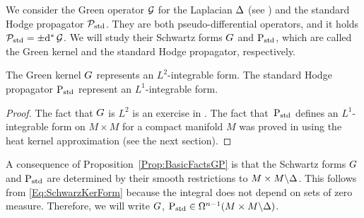 \documentclass[\MainFolder/Text.tex]{subfiles}
\begin{document}

We consider the Green operator $\operatorname{\mathcal{G}}$ for the Laplacian $\operatorname{\Delta}$ (see \cite{Warner1983}) and the standard Hodge propagator $\mathcal{P}_{\mathrm{std}}$. They are both pseudo-differential operators, and it holds $\mathcal{P}_{\mathrm{std}} = \pm \mathrm{d}^* \operatorname{\mathcal{G}}$. We will study their Schwartz forms $G$ and $\mathrm{P}_{\mathrm{std}}$, which are called the Green kernel and the standard Hodge propagator, respectively.

\begin{Proposition}\label{Prop:BasicFactsGP}
The Green kernel $G$ represents an $L^2$-integrable form.
The standard Hodge propagator $\mathrm{P}_{\mathrm{std}}$ represent an $L^1$-integrable form.
\end{Proposition}
\begin{proof}
The fact that $G$ is $L^2$ is an exercise in \cite{Warner1983}. The fact that~$\mathrm{P}_{\mathrm{std}}$ defines an $L^1$-integrable form on $M\times M$ for a compact manifold $M$ was proved in \cite{Harris2004} using the heat kernel approximation (see the next section).
\end{proof}

A consequence of Proposition~\ref{Prop:BasicFactsGP} is that the Schwartz forms $G$ and $\mathrm{P}_{\mathrm{std}}$ are determined by their smooth restrictions to $M\times M\backslash \Delta$. This follows from \eqref{Eq:SchwarzKerForm} because the integral does not depend on sets of zero measure. Therefore, we will write $G$, $\mathrm{P}_{\mathrm{std}} \in \Omega^{n-1}(M\times M\backslash\Delta)$.
\end{document}

